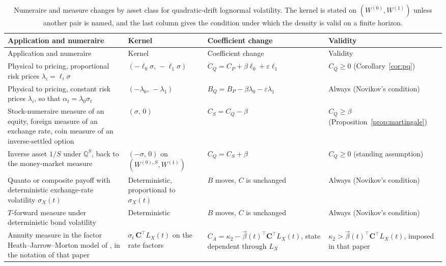 \documentclass[11pt,a4paper]{article}
\theoremstyle{definition}
\theoremstyle{remark}
\newcommand{\QS}{\mathbb{Q}^{S}}
\begin{document}
{\small
\setlength{\tabcolsep}{4pt}
\renewcommand{\arraystretch}{1.2}
\begin{longtable}{@{}P{36mm}P{32mm}P{44mm}P{38mm}@{}}
\caption{Numeraire and measure changes by asset class for quadratic-drift lognormal volatility. The kernel is stated on \((W^{(0)},W^{(1)})\) unless another pair is named, and the last column gives the condition under which the density is valid on a finite horizon.}\label{tab:numeraires}\\
\toprule
Application and numeraire & Kernel & Coefficient change & Validity\\
\midrule
\endfirsthead
\toprule Application and numeraire & Kernel & Coefficient change & Validity\\ \midrule
\endhead
\bottomrule
\endfoot
Physical to pricing, proportional risk prices \(\lambda_i=\ell_i\sigma\) & \((-\ell_0\sigma,\,-\ell_1\sigma)\) & \(C_Q=C_P+\beta\ell_0+\varepsilon\ell_1\) & \mbox{\(C_Q\geq0\)} (Corollary~\ref{cor:pq})\\
Physical to pricing, constant risk prices \(\lambda_i\), so that \(\alpha_t=\lambda_0\sigma_t\) & \((-\lambda_0,\,-\lambda_1)\) & \(B_Q=B_P-\beta\lambda_0-\varepsilon\lambda_1\) & Always (Novikov's condition)\\
Stock-numeraire measure of an equity, foreign measure of an exchange rate, coin measure of an inverse-settled option & \((\sigma,\,0)\) & \(C_S=C_Q-\beta\) & \mbox{\(C_Q\geq\beta\)} (Proposition~\ref{prop:martingale})\\
Inverse asset \(1/S\) under \(\QS\), back to the money-market measure & \((-\sigma,\,0)\) on \((W^{(0),S},W^{(1)})\) & \(C_Q=C_S+\beta\) & \mbox{\(C_Q\geq0\)} (standing assumption)\\
Quanto or composite payoff with deterministic exchange-rate volatility \(\sigma_X(t)\) & Deterministic, proportional to \(\sigma_X(t)\) & \(B\) moves, \(C\) is unchanged & Always (Novikov's condition)\\
\(T\)-forward measure under deterministic bond volatility & Deterministic & \(B\) moves, \(C\) is unchanged & Always (Novikov's condition)\\
Annuity measure in the factor Heath--Jarrow--Morton model of \citet{SeppRakhmonovFHJM2025}, in the notation of that paper & \(\sigma_t\,\mathbf C^{\top}L_X(t)\) on the rate factors & \mbox{\(C_A=\kappa_2-\vec\beta(t)^{\top}\mathbf C^{\top}L_X(t)\)}, state dependent through \(L_X\) & \mbox{\(\kappa_2>\vec\beta(t)^{\top}\mathbf C^{\top}L_X(t)\)}, imposed in that paper\\
\end{longtable}
}
\end{document}
